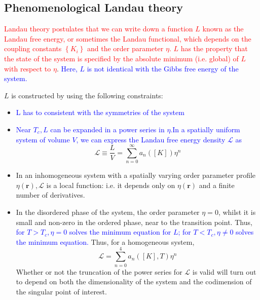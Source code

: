 \documentclass[12pt,titlepage]{article}
\newcommand{\redp}[1]{\textcolor{red}{#1}}
\newcommand{\bluep}[1]{\textcolor{blue}{#1}}
\numberwithin{equation}{section}
\begin{document}
\subsection{Phenomenological Landau theory}
\redp{Landau theory postulates that we can write down a function $L$ known as the Landau free energy\index{Landau free energy}, or sometimes the Landau functional, which depends on the coupling constants $\left\{K_{i}\right\}$ and the order parameter $\eta$. $L$ has the property that the state of the system is specified by the absolute minimum (i.e. global) of $L$ with respect to $\eta$}. \bluep{Here, $L$ is not identical with the Gibbs free energy of the system.}

$L$ is constructed by using the following constraints:

\begin{itemize}
    \item \bluep{L has to consistent with the symmetries of the system}
    \item \bluep{Near $T_{c}, L$ can be expanded in a power series in $\eta$.In a spatially uniform system of volume $V$, we can express the Landau free energy density $\mathcal{L} $ as}
    \begin{equation}
\mathcal{L} \equiv \frac{L}{V}=\sum_{n=0}^{\infty} a_{n}([K]) \eta^{n}
\end{equation}
    \item In an inhomogeneous system with a spatially varying order parameter profile $\eta(\mathbf{r}), \mathcal{L}$ is a local function: i.e. it depends only on $\eta(\mathbf{r})$ and a finite number of derivatives.
    \item In the disordered phase of the system, the order parameter $\eta=0$, whilst it is small and non-zero in the ordered phase, near to the transition point. Thus, \bluep{for $T>T_{c}, \eta=0$ solves the minimum equation for $L$; for $T<T_{c}, \eta \neq 0$ solves the minimum equation.} Thus, for a homogeneous system,
    \begin{equation}
\mathcal{L}=\sum_{n=0}^{4} a_{n}([K], T) \eta^{n}
\end{equation}
Whether or not the truncation of the power series for $\mathcal{L}$ is valid will turn out to depend on both the dimensionality of the system and the codimension of the singular point of interest.
\end{itemize}
\end{document}
